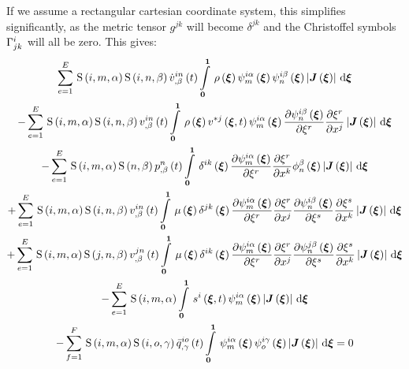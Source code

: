 If we assume a rectangular cartesian coordinate system, this simplifies
significantly, as the metric tensor $g^{jk}$ will become $\delta^{jk}$ and the
Christoffel symbols $ \Gamma^{i}_{jk} $ will all be zero. This gives:
\begin{multline}
  \gsum{e=1}{E}{\idxgsf{i}{m}{\alpha}\idxgsf{i}{n}{\beta}\fnof{\idxnodedof{\dot{v}}{i}{n}{\beta}}{t}
    \gint{\vectr{0}}{\vectr{1}}{\fnof{\rho}{\vectr{\xi}}
      \idxgbfn{i}{m}{\alpha}{\vectr{\xi}}\idxgbfn{i}{n}{\beta}{\vectr{\xi}}
      \abs{\fnof{\matr{J}}{\vectr{\xi}}}}{\vectr{\xi}}}\\
  -\gsum{e=1}{E}{\idxgsf{i}{m}{\alpha}\idxgsf{i}{n}{\beta}\fnof{\idxnodedof{v}{i}{n}{\beta}}{t}
    \gint{\vectr{0}}{\vectr{1}}{\fnof{\rho}{\vectr{\xi}}\fnof{v^{*j}}{\vectr{\xi},t}
      \idxgbfn{i}{m}{\alpha}{\vectr{\xi}}\delby{\idxgbfn{i}{n}{\beta}{\vectr{\xi}}}{\xi^{r}}
      \delby{\xi^{r}}{x^{j}}\abs{\fnof{\matr{J}}{\vectr{\xi}}}}{\vectr{\xi}}}\\
  -\gsum{e=1}{E}{\idxgsf{i}{m}{\alpha}\gsf{n}{\beta}\fnof{\nodedof{p}{n}{\beta}}{t}\gint{\vectr{0}}{\vectr{1}}{
      \fnof{\delta^{ik}}{\vectr{\xi}}\delby{\idxgbfn{i}{m}{\alpha}{\vectr{\xi}}}{\xi^{r}}\delby{\xi^{r}}{x^{k}}
      \altgbfn{n}{\beta}{\vectr{\xi}}\abs{\fnof{\matr{J}}{\vectr{\xi}}}}{\vectr{\xi}}}\\
  +\gsum{e=1}{E}{\idxgsf{i}{m}{\alpha}\idxgsf{i}{n}{\beta}\fnof{\idxnodedof{v}{i}{n}{\beta}}{t}\gint{\vectr{0}}{\vectr{1}}{
      \fnof{\mu}{\vectr{\xi}}\fnof{\delta^{jk}}{\vectr{\xi}}\delby{\idxgbfn{i}{m}{\alpha}{\vectr{\xi}}}{\xi^{r}}
      \delby{\xi^{r}}{x^{j}}\delby{\idxgbfn{i}{n}{\beta}{\vectr{\xi}}}{\xi^{s}}\delby{\xi^{s}}{x^{k}}
      \abs{\fnof{\matr{J}}{\vectr{\xi}}}}{\vectr{\xi}}}\\
  +\gsum{e=1}{E}{\idxgsf{i}{m}{\alpha}\idxgsf{j}{n}{\beta}\fnof{\idxnodedof{v}{j}{n}{\beta}}{t}
    \gint{\vectr{0}}{\vectr{1}}{\fnof{\mu}{\vectr{\xi}}\fnof{\delta^{ik}}{\vectr{\xi}}\delby{\idxgbfn{i}{m}{\alpha}{\vectr{\xi}}}{\xi^{r}}
      \delby{\xi^{r}}{x^{j}}\delby{\idxgbfn{j}{n}{\beta}{\vectr{\xi}}}{\xi^{s}}\delby{\xi^{s}}{x^{k}}
      \abs{\fnof{\matr{J}}{\vectr{\xi}}}}{\vectr{\xi}}} \\
  -\gsum{e=1}{E}{\idxgsf{i}{m}{\alpha}\gint{\vectr{0}}{\vectr{1}}{\fnof{s^{i}}{\vectr{\xi},t}
      \idxgbfn{i}{m}{\alpha}{\vectr{\xi}}\abs{\fnof{\matr{J}}{\vectr{\xi}}}}{\vectr{\xi}}}\\
  -\gsum{f=1}{F}{\idxgsf{i}{m}{\alpha}\idxgsf{i}{o}{\gamma}\fnof{\idxnodedof{\bar{q}}{i}{o}{\gamma}}{t}
    \gint{\vectr{0}}{\vectr{1}}{\idxgbfn{i}{m}{\alpha}{\vectr{\xi}}\idxgbfn{i}{o}{\gamma}{\vectr{\xi}}
      \abs{\fnof{\matr{J}}{\vectr{\xi}}}}{\vectr{\xi}}}=0\\
  \label{eqn:FEM4StokesEquation}
\end{multline}

